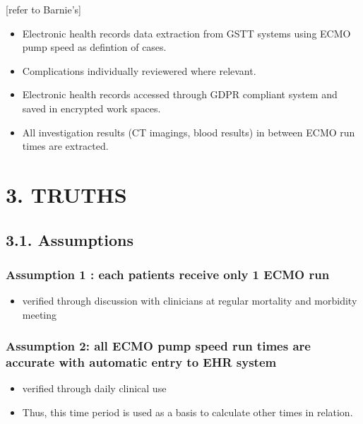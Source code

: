\documentclass[
]{article}
\providecommand{\tightlist}{%
  \setlength{\itemsep}{0pt}\setlength{\parskip}{0pt}}
\begin{document}
{[}refer to Barnie's{]}

\begin{itemize}
\tightlist
\item
  Electronic health records data extraction from GSTT systems using ECMO
  pump speed as defintion of cases.
\item
  Complications individually reviewered where relevant.
\item
  Electronic health records accessed through GDPR compliant system and
  saved in encrypted work spaces.
\item
  All investigation results (CT imagings, blood results) in between ECMO
  run times are extracted.
\end{itemize}

\hypertarget{truths}{%
\section{3. TRUTHS}\label{truths}}

\hypertarget{assumptions}{%
\subsection{3.1. Assumptions}\label{assumptions}}

\hypertarget{assumption-1-each-patients-receive-only-1-ecmo-run}{%
\subsubsection{Assumption 1 : each patients receive only 1 ECMO
run}\label{assumption-1-each-patients-receive-only-1-ecmo-run}}

\begin{itemize}
\tightlist
\item
  verified through discussion with clinicians at regular mortality and
  morbidity meeting
\end{itemize}

\hypertarget{assumption-2-all-ecmo-pump-speed-run-times-are-accurate-with-automatic-entry-to-ehr-system}{%
\subsubsection{Assumption 2: all ECMO pump speed run times are accurate
with automatic entry to EHR
system}\label{assumption-2-all-ecmo-pump-speed-run-times-are-accurate-with-automatic-entry-to-ehr-system}}

\begin{itemize}
\tightlist
\item
  verified through daily clinical use
\item
  Thus, this time period is used as a basis to calculate other times in
  relation.
\end{itemize}
\end{document}

